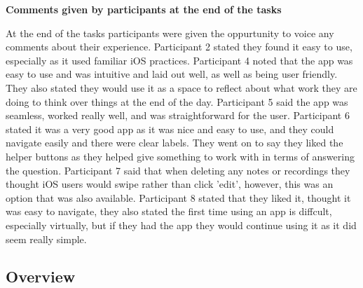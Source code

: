 \documentclass{l4proj}
\begin{document}
\textbf{Comments given by participants at the end of the tasks}
\par 
At the end of the tasks participants were given the oppurtunity to voice any comments about their experience. Participant 2
stated they found it easy to use, especially as it used familiar iOS practices. Participant 4 noted that the app was easy to 
use and was intuitive and laid out well, as well as being user friendly. They also stated they would use it as a space to reflect 
about what work they are doing to think over things at the end of the day. Participant 5 said the app was seamless, worked really 
well, and was straightforward for the user. Participant 6 stated it was a very good app as it was nice and easy to use, 
and they could navigate easily and there were clear labels. They went on to say they liked the helper buttons as they helped 
give something to work with in terms of answering the question. Participant 7 said that when deleting any notes or recordings they
thought iOS users would swipe rather than click 'edit', however, this was an option that was also available. Participant 8 stated
that they liked it, thought it was easy to navigate, they also stated the first time using an app is diffcult, especially 
virtually, but if they had the app they would continue using it as it did seem really simple.

\subsection{Overview}
\end{document}
